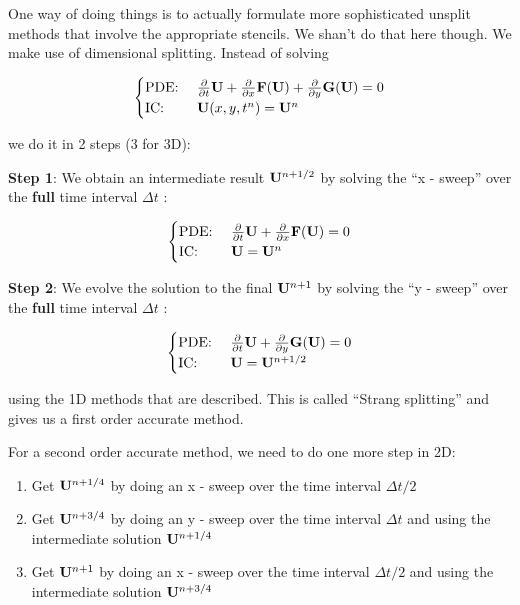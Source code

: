 One way of doing things is to actually formulate more sophisticated unsplit
methods that involve the appropriate stencils. We shan't do that here though.
We make use of dimensional splitting. Instead of solving

\begin{equation}
\begin{cases}
\text{PDE: } &
	\frac{\partial}{\partial t}{\mathbf{U}} + \frac{\partial}{\partial x}{\mathbf{F}(\mathbf{U})} + \frac{\partial}{\partial y} \mathbf{G}(\mathbf{U}) = 0
\\
\text{IC: } &
	\mathbf{U}(x, y, t^n) = \mathbf{U}^n
\end{cases}
\end{equation}

we do it in 2 steps (3 for 3D):

\textbf{Step 1}: We obtain an intermediate result $\mathbf{U}^{n+1/2}$ by solving the
``x - sweep'' over the \textbf{full} time interval $\Delta t$ :

\begin{equation}
\begin{cases}
	\text{PDE: } & \frac{\partial}{\partial t}{\mathbf{U}} + \frac{\partial}{\partial x}{\mathbf{F}(\mathbf{U})} = 0\\
	\text{IC: } &  \mathbf{U} = \mathbf{U}^n
\end{cases}
\end{equation}

\textbf{Step 2}: We evolve the solution to the final $\mathbf{U}^{n+1}$ by solving the
``y - sweep'' over the \textbf{full} time interval $\Delta t$ :

\begin{equation}
\begin{cases}
\text{PDE: } &
	\frac{\partial}{\partial t}{\mathbf{U}} + \frac{\partial}{\partial y} \mathbf{G}(\mathbf{U}) = 0
\\
\text{IC: } &
	\mathbf{U} = \mathbf{U}^{n+1/2}
\\
\end{cases}
\end{equation}

using the 1D methods that are described.
This is called ``Strang splitting'' and gives us a first order accurate method.

For a second order accurate method, we need to do one more step in 2D:

\begin{enumerate}
	\item Get $\mathbf{U}^{n + 1/4}$ by doing an x - sweep over the time interval $\Delta t / 2$
	\item Get $\mathbf{U}^{n + 3/4}$ by doing an y - sweep over the time interval $\Delta t$ and using the intermediate solution $\mathbf{U}^{n + 1/4}$
	\item Get $\mathbf{U}^{n + 1}$ by doing an x - sweep over the time interval $\Delta t / 2$ and using the intermediate solution $\mathbf{U}^{n + 3/4}$
\end{enumerate}



